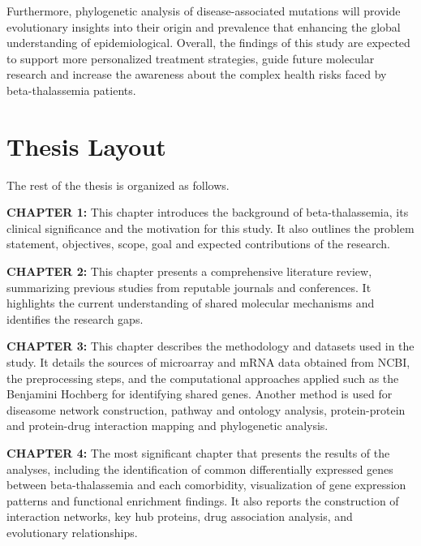 Furthermore, phylogenetic analysis of disease-associated mutations will provide evolutionary insights into their origin and prevalence that enhancing the global understanding of epidemiological. Overall, the findings of this study are expected to support more personalized treatment strategies, guide future molecular research and increase the awareness about the complex health risks faced by beta-thalassemia patients.

\section{Thesis Layout}
\label{sec:sec04}

The rest of the thesis is organized as follows.

\vspace{0.5cm}
\textbf{CHAPTER 1:}
This chapter introduces the background of beta-thalassemia, its clinical significance and the motivation for this study. It also outlines the problem statement, objectives, scope, goal and expected contributions of the research.

\vspace{0.2cm}

\textbf{CHAPTER 2:}
This chapter presents a comprehensive literature review, summarizing previous studies from reputable journals and conferences. It highlights the current understanding of shared molecular mechanisms and identifies the research gaps.

\vspace{0.2cm}

\textbf{CHAPTER 3:}
This chapter describes the methodology and datasets used in the study. It details the sources of microarray and mRNA data obtained from NCBI, the preprocessing steps, and the computational approaches applied such as the Benjamini Hochberg for identifying shared genes. Another method is used for diseasome network construction, pathway and ontology analysis, protein-protein and protein-drug interaction mapping and phylogenetic analysis.

\vspace{0.2cm}

\textbf{CHAPTER 4:}
The most significant chapter that presents the results of the analyses, including the identification of common differentially expressed genes between beta-thalassemia and each comorbidity, visualization of gene expression patterns and functional enrichment findings. It also reports the construction of interaction networks, key hub proteins, drug association analysis, and evolutionary relationships.

